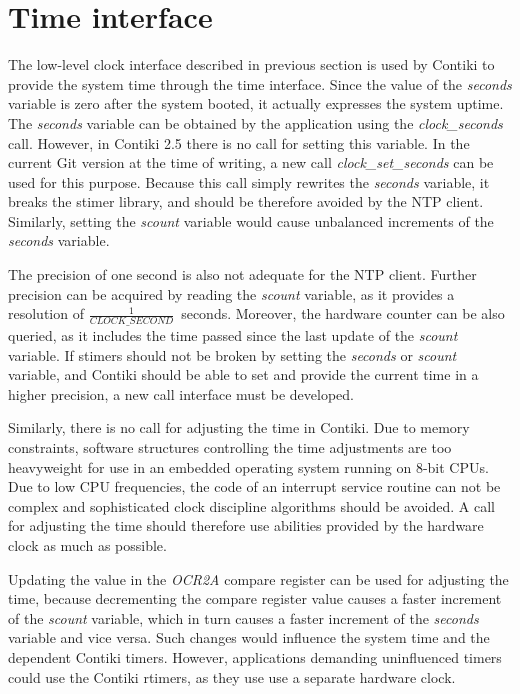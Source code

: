 
\section{Time interface}\label{sec:analysis-time}
The low-level clock interface described in previous section
is used by Contiki to provide the system time through the time interface.
Since the value of the {\it{seconds}} variable is zero after the system booted,
it actually expresses the system uptime.
The {\it{seconds}} variable can be obtained by the application using the {\it{clock\_seconds}} call.
However, in Contiki 2.5 there is no call for setting this variable.
In the current Git version at the time of writing, a new call {\it{clock\_set\_seconds}}
can be used for this purpose.
Because this call simply rewrites the {\it{seconds}} variable, it breaks the stimer library,
and should be therefore avoided by the NTP client.
Similarly, setting the {\it{scount}} variable would cause
unbalanced increments of the {\it{seconds}} variable.

The precision of one second is also not adequate for the NTP client.
Further precision can be acquired by reading the {\it{scount}} variable,
as it provides a resolution of $\frac{1}{CLOCK\_SECOND}$~seconds.
Moreover, the hardware counter can be also queried, as it includes the time passed since
the last update of the {\it{scount}} variable.
If stimers should not be broken by setting the {\it{seconds}} or {\it{scount}} variable,
and Contiki should be able to set and provide the current time in a higher precision,
a new call interface must be developed.

Similarly, there is no call for adjusting the time in Contiki.
Due to memory constraints, software structures controlling the time adjustments are too heavyweight
for use in an embedded operating system running on 8-bit CPUs.
Due to low CPU frequencies, the code of an interrupt service routine can not be complex
and sophisticated clock discipline algorithms should be avoided.
A call for adjusting the time should therefore use abilities
provided by the hardware clock as much as possible.

Updating the value in the {\it{OCR2A}} compare register
can be used for adjusting the time, because decrementing the compare register
value causes a faster increment of the {\it{scount}} variable, which in turn causes
a faster increment of the {\it{seconds}} variable and vice versa.
Such changes would influence the system time and the dependent Contiki timers.
However, applications demanding uninfluenced timers could use the Contiki rtimers,
as they use use a separate hardware clock.
